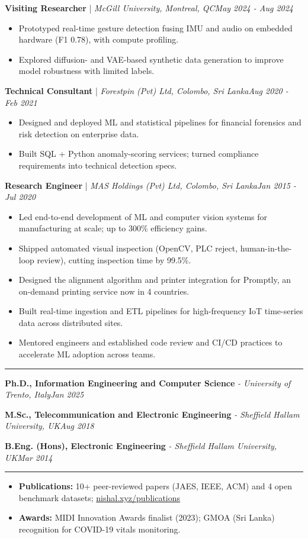 \documentclass[10pt]{article}
\newcommand{\cvsection}[1]{\par\vspace{8pt}\noindent{\large\scshape #1}\par\vspace{-5pt}\noindent\rule{\linewidth}{0.4pt}\par\vspace{2pt}}
\newenvironment{role}[4]{\par\noindent\textbf{#1} | \textit{\small #2, #3}\hfill\textit{\small #4}\par
  \begin{itemize}[leftmargin=1.3em,itemsep=0.6pt,parsep=0pt,topsep=1.5pt,partopsep=0pt]}
  {\end{itemize}\par\vspace{5pt}}
\newcommand{\eduitem}[3]{\textbf{#1} \textit{\small - #2}\hfill\textit{\small #3}\par}
\newenvironment{plainlist}{\begin{itemize}[leftmargin=1.3em,itemsep=0pt,parsep=0pt,topsep=0pt,partopsep=0pt]}{\end{itemize}}
\begin{document}
\begin{role}{Visiting Researcher}{McGill University}{Montreal, QC}{May 2024 - Aug 2024}
  \item Prototyped real-time gesture detection fusing IMU and audio on embedded hardware (F1 0.78), with compute profiling.
  \item Explored diffusion- and VAE-based synthetic data generation to improve model robustness with limited labels.
\end{role}

\begin{role}{Technical Consultant}{Forestpin (Pvt) Ltd}{Colombo, Sri Lanka}{Aug 2020 - Feb 2021}
  \item Designed and deployed ML and statistical pipelines for financial forensics and risk detection on enterprise data.
  \item Built SQL + Python anomaly-scoring services; turned compliance requirements into technical detection specs.
\end{role}

\begin{role}{Research Engineer}{MAS Holdings (Pvt) Ltd}{Colombo, Sri Lanka}{Jan 2015 - Jul 2020}
  \item Led end-to-end development of ML and computer vision systems for manufacturing at scale; up to 300\% efficiency gains.
  \item Shipped automated visual inspection (OpenCV, PLC reject, human-in-the-loop review), cutting inspection time by 99.5\%.
  \item Designed the alignment algorithm and printer integration for Promptly, an on-demand printing service now in 4 countries.
  \item Built real-time ingestion and ETL pipelines for high-frequency IoT time-series data across distributed sites.
  \item Mentored engineers and established code review and CI/CD practices to accelerate ML adoption across teams.
\end{role}

\cvsection{Education}
\eduitem{Ph.D., Information Engineering and Computer Science}{University of Trento, Italy}{Jan 2025}
\eduitem{M.Sc., Telecommunication and Electronic Engineering}{Sheffield Hallam University, UK}{Aug 2018}
\eduitem{B.Eng. (Hons), Electronic Engineering}{Sheffield Hallam University, UK}{Mar 2014}

\cvsection{Publications \& Awards}
\begin{plainlist}
  \item \textbf{Publications:} 10+ peer-reviewed papers (JAES, IEEE, ACM) and 4 open benchmark datasets; \href{https://nishal.xyz/publications}{nishal.xyz/publications}
  \item \textbf{Awards:} MIDI Innovation Awards finalist (2023); GMOA (Sri Lanka) recognition for COVID-19 vitals monitoring.
\end{plainlist}
\end{document}
